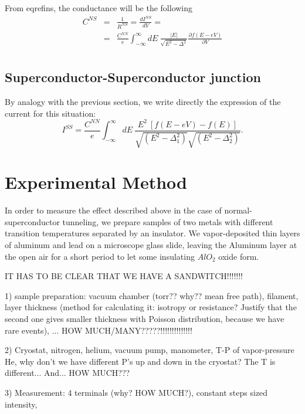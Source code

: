 \documentclass[twocolumn, twoside,a4paper,10pt]{article}
\begin{document}
From eqref{ins}, the conductance will be the following
\begin{eqnarray}\label{cns}
C^{NS} &=& \frac{1}{R^{NS}} = \frac{dI^{NS}}{dV} =
		\nonumber \\
		&=& \frac{C^{NN}}{e} \int_{-\infty}^{\infty} dE\ \frac{|E|}{\sqrt{E^2-\Delta^2}} 
		\frac{\partial f(E-eV)}{\partial V}
		\nonumber \\
\end{eqnarray}

\subsection{Superconductor-Superconductor junction} 
By analogy with the previous section, we write directly the expression of the current for this situation:
\begin{equation}\label{ins}
I^{SS} = \frac{C^{NN}}{e} \int_{-\infty}^{\infty} dE\ 
		\frac{E^2\ [f(E-eV)-f(E)]}{\sqrt{(E^2-\Delta_1 ^2)}\sqrt{(E^2-\Delta_2 ^2)}}.
\end{equation}

\section{Experimental Method}
In order to measure the effect described above in the case of normal-superconductor tunneling, we prepare samples of two metals with different transition temperatures separated by an insulator. We vapor-deposited thin layers of aluminum and lead on a microscope glass slide,  leaving the Aluminum layer at the open air for a short period to let some insulating $AlO_2$ oxide form.

IT HAS TO BE CLEAR THAT WE HAVE A SANDWITCH!!!!!!!

1) sample preparation: vacuum chamber (torr?? why?? mean free path), filament, layer thickness (method for calculating it: isotropy or resistance? Justify that the second one gives smaller thickness with Poisson distribution, because we have rare events), ... HOW MUCH/MANY?????!!!!!!!!!!!!!!

2) Cryostat, nitrogen, helium, vacuum pump, manometer, T-P of vapor-pressure He, why don't we have different P's up and down in the cryostat? The T is different... And... HOW MUCH???

3) Measurement: 4 terminals (why? HOW MUCH?), constant steps sized intensity, 
\end{document}
